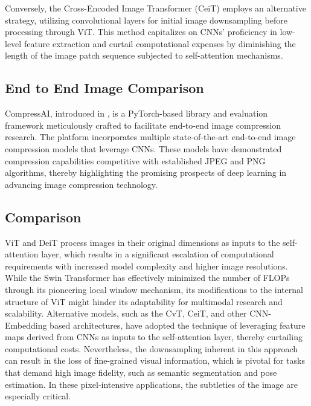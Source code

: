 Conversely, the Cross-Encoded Image Transformer (CeiT) \cite{yuan2021incorporating} employs an alternative strategy, 
utilizing convolutional layers for initial image downsampling before processing through ViT. 
This method capitalizes on CNNs' proficiency in low-level feature extraction and curtail computational expenses by diminishing the length of the 
image patch sequence subjected to self-attention mechanisms.

\subsection{End to End Image Comparison}
\label{subsec:end_to_end_comparison}

CompressAI, introduced in \cite{begaint2020compressai}, is a PyTorch-based library and evaluation framework 
meticulously crafted to facilitate end-to-end image compression research.
The platform incorporates multiple state-of-the-art end-to-end image compression models\cite{balle2018variational,minnen2018joint,cheng2020learned} that leverage CNNs.
These models have demonstrated compression capabilities competitive with established JPEG and PNG algorithms, 
thereby highlighting the promising prospects of deep learning in advancing image compression technology.
\subsection{Comparison}
\label{subsec:comparison}

ViT and DeiT process images in their original dimensions as inputs to the self-attention layer, 
which results in a significant escalation of computational requirements with increased model complexity and higher image resolutions.
While the Swin Transformer has effectively minimized the number of FLOPs through its pioneering local window mechanism, 
its modifications to the internal structure of ViT might hinder its adaptability for multimodal research and scalability.
Alternative models, such as the CvT, CeiT, and other CNN-Embedding based architectures, 
have adopted the technique of leveraging feature maps derived from CNNs as inputs to the self-attention layer, thereby curtailing computational costs.
Nevertheless, the downsampling inherent in this approach can result in the loss of fine-grained visual information, which is pivotal for tasks that demand high image fidelity, 
such as semantic segmentation and pose estimation. In these pixel-intensive applications, the subtleties of the image are especially critical.

